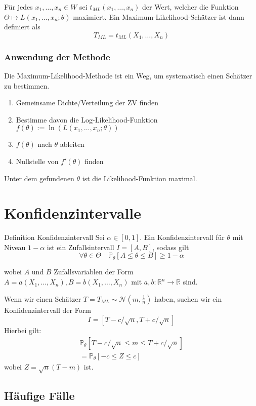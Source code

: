 \documentclass[a4paper,10pt]{article}
\def\R{\mathbb{R}}
\def\P{\mathbb{P}}
\begin{document}
\noindent Für jedes \(x_1, \ldots, x_n \in W\) sei \(t_{ML}(x_1, \ldots, x_n)\) der Wert, welcher die Funktion \(\Theta \mapsto L(x_1, \ldots, x_n; \theta)\) maximiert. Ein Maximum-Likelihood-Schätzer ist dann definiert als
\[T_{ML} = t_{ML}(X_1, \ldots, X_n)\]

\subsubsection{Anwendung der Methode}
Die Maximum-Likelihood-Methode ist ein Weg, um systematisch einen Schätzer zu bestimmen.
\begin{enumerate}
	\item Gemeinsame Dichte/Verteilung der ZV finden
	\item Bestimme davon die Log-Likelihood-Funktion\\ \(f(\theta) := \ln(L(x_1, \ldots, x_n;\theta))\)
	\item \(f(\theta)\) nach \(\theta\) ableiten
	\item Nullstelle von \(f'(\theta)\) finden
\end{enumerate}
Unter dem gefundenen \(\theta\) ist die Likelihood-Funktion maximal.

\section{Konfidenzintervalle}
\begin{mainbox}{Definition Konfidenzintervall}
	Sei \(\alpha \in [0,1]\). Ein Konfidenzintervall für \(\theta\) mit Niveau \(1 - \alpha\) ist ein Zufallsintervall \(I=[A,B]\), sodass gilt
	\[\forall \theta \in \Theta \quad \P_\theta[A\le \theta \le B] \ge 1- \alpha\]

	wobei \(A\) und \(B\) Zufallsvariablen der Form \(A = a(X_1, \ldots, X_n), B = b(X_1, \ldots, X_n)\) mit \(a,b: \R^n \to \R\) sind.
\end{mainbox}

Wenn wir einen Schätzer \(T = T_{ML} \sim \mathcal{N}(m, \frac{1}{n})\) haben, suchen wir ein Konfidenzintervall der Form
\[I = [T-c/\sqrt{n}, T+c/\sqrt{n}]\]
Hierbei gilt:
\begin{align*}
	\P_\theta[T-c/\sqrt{n} \le m \le T+c/\sqrt{n}] \\
	= \P_\theta[-c\le Z \le c]
\end{align*}
wobei \(Z = \sqrt{n}(T-m)\) ist.

\subsection{Häufige Fälle}
\end{document}
